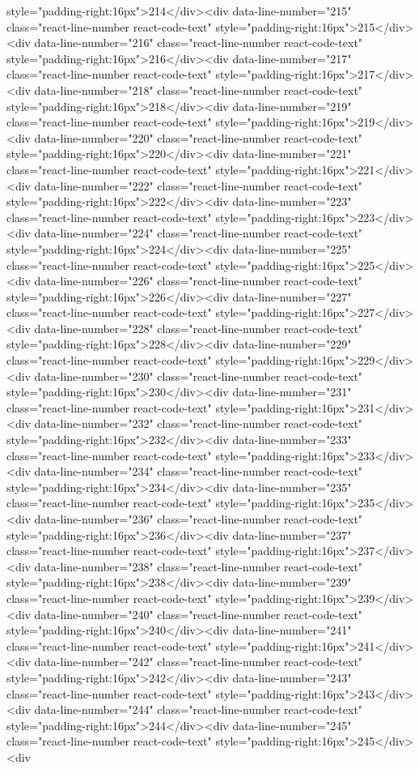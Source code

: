 style="padding-right:16px">214</div><div data-line-number="215" class="react-line-number react-code-text" style="padding-right:16px">215</div><div data-line-number="216" class="react-line-number react-code-text" style="padding-right:16px">216</div><div data-line-number="217" class="react-line-number react-code-text" style="padding-right:16px">217</div><div data-line-number="218" class="react-line-number react-code-text" style="padding-right:16px">218</div><div data-line-number="219" class="react-line-number react-code-text" style="padding-right:16px">219</div><div data-line-number="220" class="react-line-number react-code-text" style="padding-right:16px">220</div><div data-line-number="221" class="react-line-number react-code-text" style="padding-right:16px">221</div><div data-line-number="222" class="react-line-number react-code-text" style="padding-right:16px">222</div><div data-line-number="223" class="react-line-number react-code-text" style="padding-right:16px">223</div><div data-line-number="224" class="react-line-number react-code-text" style="padding-right:16px">224</div><div data-line-number="225" class="react-line-number react-code-text" style="padding-right:16px">225</div><div data-line-number="226" class="react-line-number react-code-text" style="padding-right:16px">226</div><div data-line-number="227" class="react-line-number react-code-text" style="padding-right:16px">227</div><div data-line-number="228" class="react-line-number react-code-text" style="padding-right:16px">228</div><div data-line-number="229" class="react-line-number react-code-text" style="padding-right:16px">229</div><div data-line-number="230" class="react-line-number react-code-text" style="padding-right:16px">230</div><div data-line-number="231" class="react-line-number react-code-text" style="padding-right:16px">231</div><div data-line-number="232" class="react-line-number react-code-text" style="padding-right:16px">232</div><div data-line-number="233" class="react-line-number react-code-text" style="padding-right:16px">233</div><div data-line-number="234" class="react-line-number react-code-text" style="padding-right:16px">234</div><div data-line-number="235" class="react-line-number react-code-text" style="padding-right:16px">235</div><div data-line-number="236" class="react-line-number react-code-text" style="padding-right:16px">236</div><div data-line-number="237" class="react-line-number react-code-text" style="padding-right:16px">237</div><div data-line-number="238" class="react-line-number react-code-text" style="padding-right:16px">238</div><div data-line-number="239" class="react-line-number react-code-text" style="padding-right:16px">239</div><div data-line-number="240" class="react-line-number react-code-text" style="padding-right:16px">240</div><div data-line-number="241" class="react-line-number react-code-text" style="padding-right:16px">241</div><div data-line-number="242" class="react-line-number react-code-text" style="padding-right:16px">242</div><div data-line-number="243" class="react-line-number react-code-text" style="padding-right:16px">243</div><div data-line-number="244" class="react-line-number react-code-text" style="padding-right:16px">244</div><div data-line-number="245" class="react-line-number react-code-text" style="padding-right:16px">245</div><div 